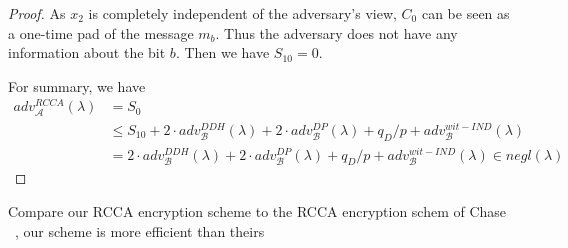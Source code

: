 \begin{proof}
  As $x_2$ is completely independent of the adversary's view, $C_0$ can be seen as a one-time pad of the message $m_b$. Thus the adversary does not have any information about the bit $b$. Then we have $S_{10} = 0$.

  For summary, we have
  \begin{align*}
    adv_{\mathcal{A}}^{RCCA}(\lambda) &= S_0\\
    &\leq S_{10} + 2 \cdot adv_{\mathcal{B}}^{DDH}(\lambda) + 2 \cdot adv_{\mathcal{B}}^{DP}(\lambda) + q_D/p + adv_{\mathcal{B}}^{wit-IND}(\lambda)\\
    &= 2 \cdot adv_{\mathcal{B}}^{DDH}(\lambda) + 2 \cdot adv_{\mathcal{B}}^{DP}(\lambda) + q_D/p + adv_{\mathcal{B}}^{wit-IND}(\lambda) \in negl(\lambda)
  \end{align*}
\end{proof}


Compare our RCCA encryption scheme to the RCCA encryption schem of Chase \etal~\cite{DBLP:conf/eurocrypt/ChaseKLM12}, our scheme is more efficient than theirs


